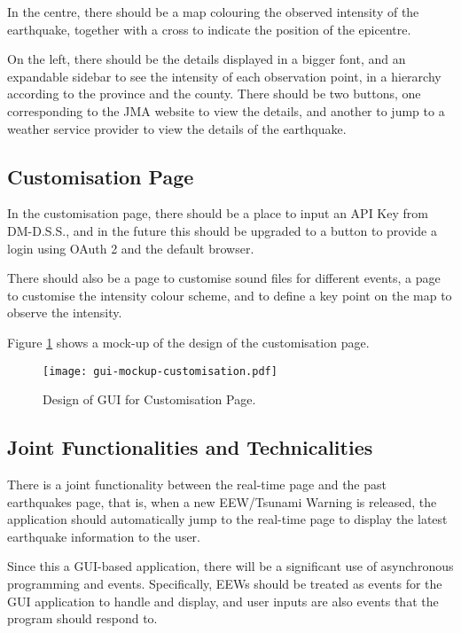 In the centre, there should be a map colouring the observed intensity of the earthquake, together with a cross to indicate the position of the epicentre.

On the left, there should be the details displayed in a bigger font, and an expandable sidebar to see the intensity of each observation point, in a hierarchy according to the province and the county. There should be two buttons, one corresponding to the JMA website to view the details, and another to jump to a weather service provider to view the details of the earthquake.

\subsection{Customisation Page}

In the customisation page, there should be a place to input an API Key from DM-D.S.S., and in the future this should be upgraded to a button to provide a login using OAuth 2 and the default browser.

There should also be a page to customise sound files for different events, a page to customise the intensity colour scheme, and to define a key point on the map to observe the intensity.

Figure \ref{fig:gui-mockup-customisation} shows a mock-up of the design of the customisation page.

\begin{figure}[!ht]
    \centering
    \texttt{[image: gui-mockup-customisation.pdf]}
    \caption{Design of GUI for Customisation Page.}
    \label{fig:gui-mockup-customisation}
\end{figure}

\subsection{Joint Functionalities and Technicalities}

There is a joint functionality between the real-time page and the past earthquakes page, that is, when a new EEW/Tsunami Warning is released, the application should automatically jump to the real-time page to display the latest earthquake information to the user.

Since this a GUI-based application, there will be a significant use of asynchronous programming and events. Specifically, EEWs should be treated as events for the GUI application to handle and display, and user inputs are also events that the program should respond to.

